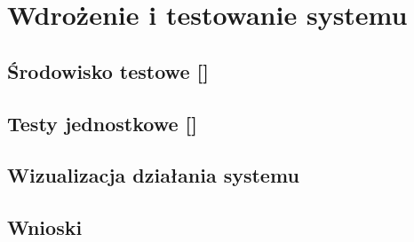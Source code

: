 \newpage\section{Wdrożenie i testowanie systemu \NazwaSys} \label{sec:testy}
\subsection[Środowisko testowe]{Środowisko testowe [\StudentA]}

\subsection{Testy jednostkowe [\StudentB]}

\subsection{Wizualizacja działania systemu \textsl{\NazwaSys}}

\subsection{Wnioski}
 
